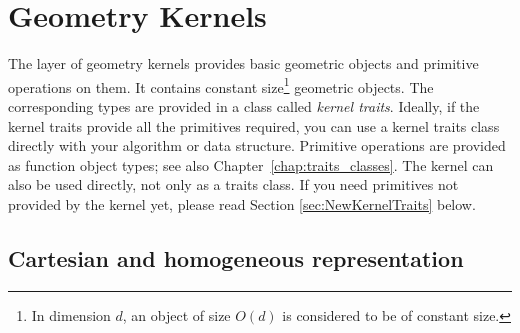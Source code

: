 
\chapter{Geometry Kernels} \label{chap:kernels}


The layer of geometry kernels
provides basic geometric objects
and primitive operations on them. 
It contains constant size\footnote{In dimension $d$, an object of 
size $O(d)$ is considered to be of constant size.} geometric objects.
The corresponding types are provided in a class called {\em kernel traits}.
%
%
Ideally, if the kernel traits provide all the primitives required,
you can use a kernel traits class directly with your algorithm or 
data structure. Primitive operations are provided
as function object types;
see also Chapter~\ref{chap:traits_classes}.
The kernel can also be used directly, not only as a traits class.
If you need primitives not provided by the kernel yet, please
read Section \ref{sec:NewKernelTraits} below.

\section{Cartesian and homogeneous representation}
\label{sec:cart_and_hom_representation}

